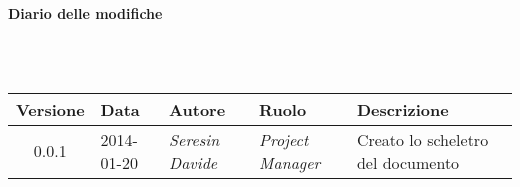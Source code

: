 \noindent\begin{Large}\textbf{Diario delle modifiche}\end{Large}\\
\\
\begin{small}
\begin{tabular}{|c|p{1.8cm}|p{2.8cm}|p{2.8cm}|p{3.5cm}|}
\hline
Versione & Data & Autore & Ruolo & Descrizione \\
\hline
\hline
0.0.1 & 2014-01-20 & 
\textit{Seresin Davide} &
\textit{Project Manager} &  Creato lo scheletro del documento\\
\hline
\end{tabular}\\
\end{small}